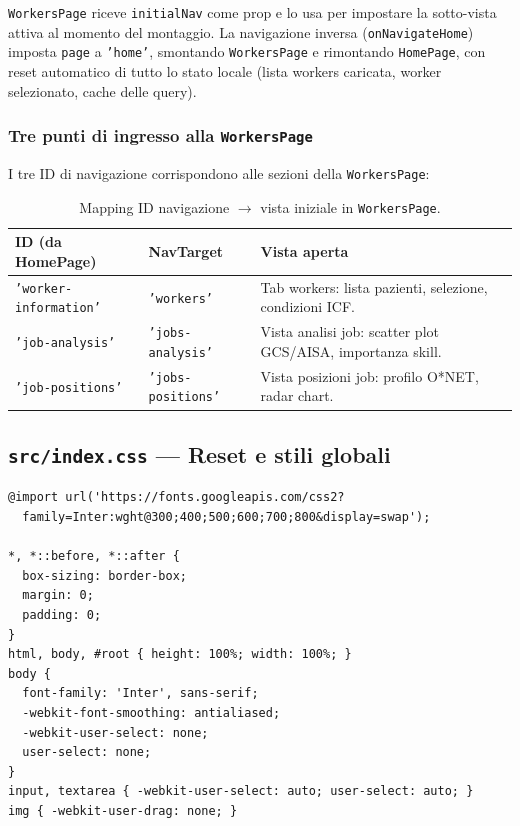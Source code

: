 \documentclass[a4paper,12pt]{article}
\begin{document}
\texttt{WorkersPage} riceve \texttt{initialNav} come prop e lo usa
per impostare la sotto-vista attiva al momento del montaggio.
La navigazione inversa (\texttt{onNavigateHome}) imposta \texttt{page}
a \texttt{'home'}, smontando \texttt{WorkersPage} e rimontando
\texttt{HomePage}, con reset automatico di tutto lo stato locale
(lista workers caricata, worker selezionato, cache delle query).

\subsubsection{Tre punti di ingresso alla \texttt{WorkersPage}}

I tre ID di navigazione corrispondono alle sezioni della \texttt{WorkersPage}:

\begin{table}[H]
\centering
\caption{Mapping ID navigazione $\rightarrow$ vista iniziale in \texttt{WorkersPage}.}
\begin{tabular}{L{4cm} L{3.5cm} L{5cm}}
\toprule
\textbf{ID (da HomePage)} & \textbf{NavTarget} & \textbf{Vista aperta} \\
\midrule
{\small\texttt{'worker-information'}} & {\small\texttt{'workers'}} &
  Tab workers: lista pazienti, selezione, condizioni ICF. \\
\texttt{'job-analysis'} & \texttt{'jobs-analysis'} &
  Vista analisi job: scatter plot GCS/AISA, importanza skill. \\
\texttt{'job-positions'} & \texttt{'jobs-positions'} &
  Vista posizioni job: profilo O*NET, radar chart. \\
\bottomrule
\end{tabular}
\end{table}

\subsection{\texttt{src/index.css} --- Reset e stili globali}

\begin{lstlisting}[caption={\texttt{index.css} --- CSS globale dell'applicazione.}]
@import url('https://fonts.googleapis.com/css2?
  family=Inter:wght@300;400;500;600;700;800&display=swap');

*, *::before, *::after {
  box-sizing: border-box;
  margin: 0;
  padding: 0;
}
html, body, #root { height: 100%; width: 100%; }
body {
  font-family: 'Inter', sans-serif;
  -webkit-font-smoothing: antialiased;
  -webkit-user-select: none;
  user-select: none;
}
input, textarea { -webkit-user-select: auto; user-select: auto; }
img { -webkit-user-drag: none; }
\end{lstlisting}
\end{document}
